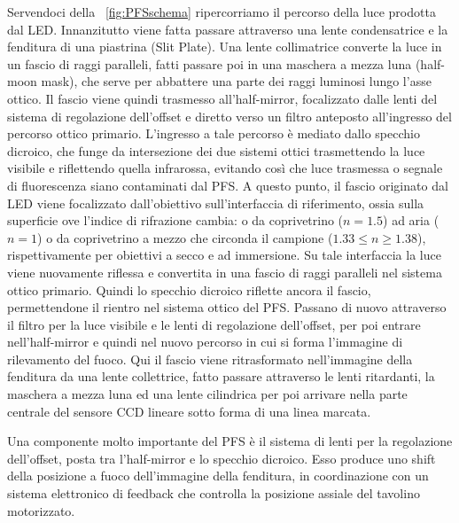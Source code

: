 Servendoci della \figurename~\ref{fig:PFSschema} ripercorriamo il percorso della luce prodotta dal LED. 
Innanzitutto viene fatta passare attraverso una lente condensatrice e la fenditura di una piastrina (Slit Plate).
Una lente collimatrice converte la luce in un fascio di raggi paralleli, fatti passare poi in una maschera a mezza luna (half-moon mask), che serve per abbattere una parte dei raggi luminosi lungo l'asse ottico.
Il fascio viene quindi trasmesso all'half-mirror, focalizzato dalle lenti del sistema di regolazione dell'offset e diretto verso un filtro anteposto all'ingresso del percorso ottico primario. 
L'ingresso a tale percorso è mediato dallo specchio dicroico, che funge da intersezione dei due sistemi ottici trasmettendo la luce visibile e riflettendo quella infrarossa, evitando così che luce trasmessa o segnale di fluorescenza siano contaminati dal PFS. 
A questo punto, il fascio originato dal LED viene focalizzato dall'obiettivo sull'interfaccia di riferimento, ossia sulla superficie ove l'indice di rifrazione cambia: o da coprivetrino ($n=1.5$) ad aria ($n=1$) o da coprivetrino a mezzo che circonda il campione ($1.33\leq n \geq 1.38$), rispettivamente per obiettivi a secco e ad immersione. 
Su tale interfaccia la luce viene nuovamente riflessa e convertita in una fascio di raggi paralleli nel sistema ottico primario. 
Quindi lo specchio dicroico riflette ancora il fascio, permettendone il rientro nel sistema ottico del PFS.
Passano di nuovo attraverso il filtro per la luce visibile e le lenti di regolazione dell'offset, per poi entrare nell'half-mirror e quindi nel nuovo percorso in cui si forma l'immagine di rilevamento del fuoco. 
Qui il fascio viene ritrasformato nell'immagine della fenditura da una lente collettrice, fatto passare attraverso le lenti ritardanti, la maschera a mezza luna ed una lente cilindrica per poi arrivare nella parte centrale del sensore CCD lineare sotto forma di una linea marcata.

Una componente molto importante del PFS è il sistema di lenti per la regolazione dell'offset, posta tra l'half-mirror e lo specchio dicroico.
Esso produce uno shift della posizione a fuoco dell'immagine della fenditura, in coordinazione con un sistema elettronico di feedback che controlla la posizione assiale del tavolino motorizzato.

